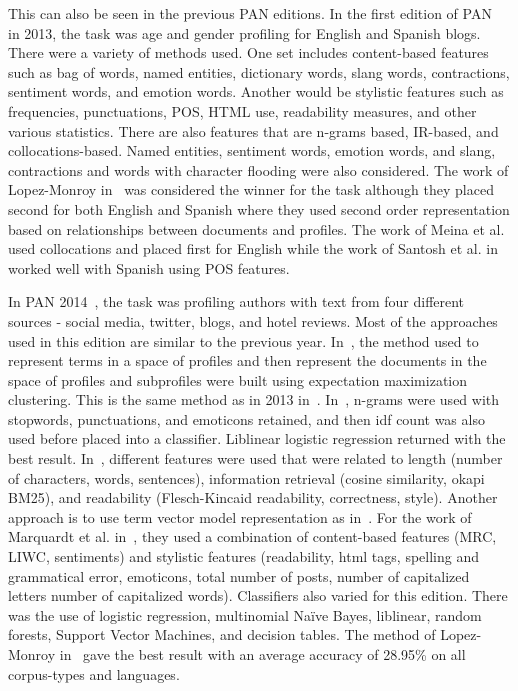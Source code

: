 \documentclass{llncs}
\begin{document}
This can also be seen in the previous PAN editions. In the first edition of PAN~\cite{rangel2013overview} in 2013, the task  was age and gender profiling for English and Spanish blogs. There were a variety of methods used. One set includes content-based features such as bag of words, named entities, dictionary words, slang words, contractions, sentiment words, and emotion words. Another would be stylistic features such as frequencies, punctuations, POS, HTML use, readability measures, and other various statistics. There are also features that are n-grams based, IR-based, and collocations-based. Named entities, sentiment words, emotion words, and slang, contractions and words with character flooding were also considered. The work of Lopez-Monroy in~\cite{lopez2013inaoe} was considered the winner for the task although they placed second for both English and Spanish where they used second order representation based on relationships between documents and profiles. The work of Meina et al.~\cite{meina2013ensemble} used collocations and placed first for English while the work of Santosh et al. in~\cite{santosh2013author} worked well with Spanish using POS features.

In PAN 2014~\cite{rangel2014overview}, the task was profiling authors with text from four different sources - social media, twitter, blogs, and hotel reviews. Most of the approaches used in this edition are similar to the previous year. In~\cite{lopezusing}, the method used to represent terms in a space of profiles and then represent the documents in the space of profiles and subprofiles were built using expectation maximization clustering. This is the same method as in 2013 in~\cite{lopez2013inaoe}. In~\cite{maharjansimple}, n-grams were used with stopwords, punctuations, and emoticons retained, and then idf count was also used before placed into a classifier. Liblinear logistic regression returned with the best result. In~\cite{weren6exploring}, different features were used that were related to length (number of characters, words, sentences), information retrieval (cosine similarity, okapi BM25), and readability (Flesch-Kincaid readability, correctness, style). Another approach is to use term vector model representation as in~\cite{villenadaedalus}. For the work of Marquardt et al. in~\cite{marquardt2014age}, they used a combination of content-based features (MRC, LIWC, sentiments) and stylistic features (readability, html tags, spelling and grammatical error, emoticons, total number of posts, number of capitalized letters number of capitalized words). Classifiers also varied for this edition. There was the use of logistic regression, multinomial Naïve Bayes, liblinear, random forests, Support Vector Machines, and decision tables. The method of Lopez-Monroy in~\cite{lopezusing} gave the best result with an average accuracy of 28.95\% on all corpus-types and languages.
\end{document}

